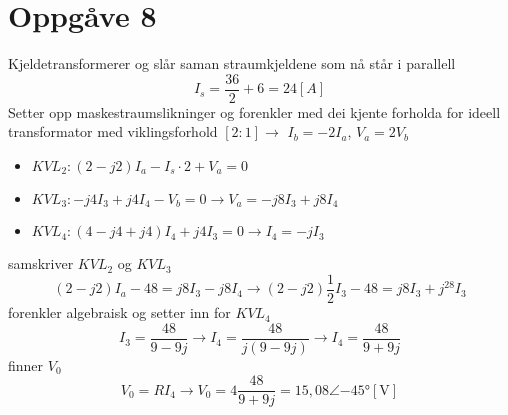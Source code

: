 \documentclass[12pt,a4paper]{article}
\begin{document}
  \section*{Oppgåve 8}
    Kjeldetransformerer og slår saman straumkjeldene som nå står i parallell
    \begin{equation}
      I_s = \frac{36}{2} + 6 = 24[A]
    \end{equation}
    Setter opp maskestraumslikninger og forenkler med dei kjente forholda for
    ideell transformator med viklingsforhold $[2:1]\rightarrow$ $I_b = -2I_a$, $V_a = 2V_b$
    \begin{itemize}
      \item $KVL_2: (2-j2)I_a - I_s\cdot 2 + V_a = 0$
      \item $KVL_3: -j4I_3 + j4I_4 - V_b = 0 \rightarrow V_a = -j8I_3 + j8I_4$
      \item $KVL_4: (4 -j4 +j4)I_4 + j4I_3 = 0 \rightarrow I_4 = -jI_3$
    \end{itemize}
    samskriver $KVL_2$ og $KVL_3$
    \begin{equation}
      (2-j2)I_a -48 = j8I_3 -j8I_4 \rightarrow (2-j2)\frac{1}{2}I_3 -48 = j8I_3 +j^28I_3
    \end{equation}
    forenkler algebraisk og setter inn for $KVL_4$
    \begin{equation}
      I_3 = \frac{48}{9-9j} \rightarrow 
      I_4 = \frac{48}{j(9-9j)} \rightarrow
      I_4 = \frac{48}{9+9j}
    \end{equation}
    finner $V_0$
    \begin{equation}
      V_0 = RI_4 \rightarrow V_0 = 4\frac{48}{9+9j} = 15,08\angle\ang{-45}[\si{\volt}]
    \end{equation}
\end{document}
